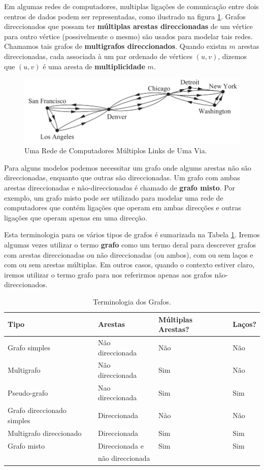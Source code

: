 Em algumas redes de computadores, multiplas ligações de comunicação entre dois
centros de dados podem ser representadas, como ilustrado na figura \ref{fig54}.
Grafos direccionados que possam ter \textbf{múltiplas arestas direccionadas} de
um vértice para outro vértice (possivelmente o mesmo) são usados para modelar
tais redes. Chamamos tais grafos de \textbf{multigrafos direccionados}. Quando
existm $m$ arestas direccionadas, cada associada à um par ordenado de vértices
$(u,v)$, dizemos que $(u,v)$ é uma aresta de \textbf{multiplicidade} $m$.

\begin{figure}[H]
	\centering
	\includegraphics[scale=2]{chapter/imagens/54}
	\caption{Uma Rede de Computadores Múltiplos Links de Uma Via.}
	\label{fig54}
\end{figure}

Para alguns modelos podemos necessitar um grafo onde algums arestas não são
direccionadas, enquanto que outras são direccionadas. Um grafo com ambas arestas
direccionadas e não-direccionadas é chamado de \textbf{grafo misto}. Por
exemplo, um grafo misto pode ser utilizado para modelar uma rede de computadores
que contém ligações que operam em ambas direcções e outras ligações que operam
apenas em uma direcção.

Esta terminologia para os vários tipos de grafos é sumarizada na Tabela
\ref{tab51}. Iremos algumas vezes utilizar o termo \textbf{grafo} como um termo
deral para descrever grafos com arestas direccionadas ou não direccionadas (ou
ambos), com ou sem laços e com ou sem arestas múltiplas. Em outros casos, quando
o contexto estiver claro, iremos utilizar o termo grafo para nos referirmos
apenas aos grafos não-direccionados.

\begin{table}[H]
\centering
\begin{tabular}{|l|l|l|l|}%
\toprule
\textbf{Tipo} & \textbf{Arestas} & \textbf{Múltiplas Arestas?} &
\textbf{Laços?}
\\
\midrule
Grafo simples & Não direccionada & Não & Não \\
Multigrafo & Não direccionada & Sim & Não \\
Pseudo-grafo & Nao direccionada & Sim & Sim \\
Grafo direccionado simples & Direccionada & Não & Não \\
Multigrafo direccionado & Direccionada & Sim & Sim \\
Grafo misto & Direccionada e& Sim & Sim\\
&  \qquad não direccionada & &\\
\bottomrule%
\end{tabular}%
\caption{Terminologia dos Grafos.}
\label{tab51}
\end{table}

